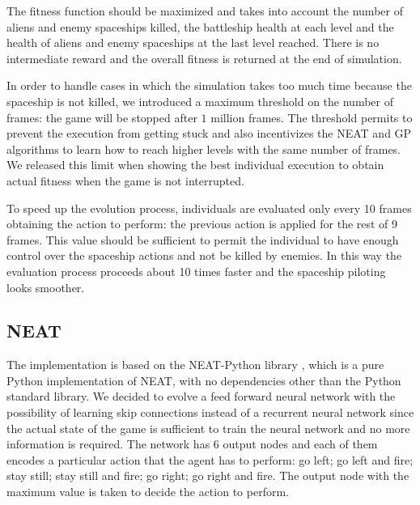 The fitness function should be maximized and takes into account the number of aliens and
enemy spaceships killed, the battleship health at each level and the health of aliens and
enemy spaceships at the last level reached. There is no intermediate reward and the overall
fitness is returned at the end of simulation.

In order to handle cases in which the simulation takes too much time because the spaceship
is not killed, we introduced a maximum threshold on the number of frames: the game will be
stopped after $1$ million frames. The threshold permits to prevent the execution from getting
stuck and also incentivizes the NEAT and GP algorithms to learn how to reach higher levels
with the same number of frames. We released this limit when showing the best individual
execution to obtain actual fitness when the game is not interrupted.

To speed up the evolution process, individuals are evaluated only every 10 frames obtaining
the action to perform: the previous action is applied for the rest of 9 frames. This value
should be sufficient to permit the individual to have enough control over the spaceship
actions and not be killed by enemies. In this way the evaluation process proceeds about 10
times faster and the spaceship piloting looks smoother.


\subsection{NEAT}
The implementation is based on the NEAT-Python library \cite{NEAT-Python}, which is a pure Python
implementation of NEAT, with no dependencies other than the Python standard library.
We decided to evolve a feed forward neural network with the possibility of learning skip
connections instead of a recurrent neural network since the actual state of the game is
sufficient to train the neural network and no more information is required. The network has 6
output nodes and each of them encodes a particular action that the agent has to perform:
go left; go left and fire; stay still; stay still and fire; go right; go right and fire.
The output node with the maximum value is taken to decide the action to perform.

